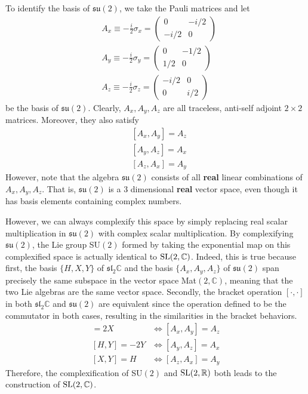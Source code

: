   To identify the basis of $\mathfrak{su}(2)$, we take the Pauli matrices and let 
  \begin{align*}
    & A_x \equiv - \frac{i}{2} \sigma_x = \begin{pmatrix} 0&-i/2\\-i/2&0 \end{pmatrix} \\
    & A_y \equiv - \frac{i}{2} \sigma_y = \begin{pmatrix}0&-1/2\\1/2&0\end{pmatrix} \\
    & A_z \equiv -\frac{i}{2} \sigma_z = \begin{pmatrix}-i/2&0\\0&i/2\end{pmatrix}
  \end{align*} 
  be the basis of $\mathfrak{su}(2)$. Clearly, $A_x, A_y, A_z$ are all traceless, anti-self adjoint $2 \times 2$ matrices. Moreover, they also satisfy
  \begin{align*}
    & [A_x, A_y] = A_z \\
    & [A_y, A_z] = A_x \\
    & [A_z, A_x] = A_y
  \end{align*}
  However, note that the algebra $\mathfrak{su}(2)$ consists of all \textbf{real} linear combinations of $A_x, A_y, A_z$. That is, $\mathfrak{su}(2)$ is a 3 dimensional \textbf{real} vector space, even though it has basis elements containing complex numbers. 

  However, we can always complexify this space by simply replacing real scalar multiplication in $\mathfrak{su}(2)$ with complex scalar multiplication. By complexifying $\mathfrak{su}(2)$, the Lie group SU$(2)$ formed by taking the exponential map on this complexified space is actually identical to $\SL(2, \mathbb{C})$. Indeed, this is true because first, the basis $\{H, X, Y\}$ of $\mathfrak{sl}_2 \mathbb{C}$ and the basis $\{A_x, A_y, A_z\}$ of $\mathfrak{su}(2)$ span precisely the same subspace in the vector space Mat$(2, \mathbb{C})$, meaning that the two Lie algebras are the same vector space. Secondly, the bracket operation $[\cdot, \cdot]$ in both $\mathfrak{sl}_2 \mathbb{C}$ and $\mathfrak{su}(2)$ are equivalent since the operation defined to be the commutator in both cases, resulting in the similarities in the bracket behaviors. 
  \begin{align*}
    [H,X] = 2X & \iff [A_x, A_y] = A_z \\
    [H,Y] = - 2Y & \iff [A_y, A_z] = A_x\\
    [X,Y] = H & \iff  [A_z, A_x] = A_y 
  \end{align*}
  Therefore, the complexification of SU$(2)$ and $\SL(2, \mathbb{R})$ both leads to the construction of $\SL(2, \mathbb{C})$. 

